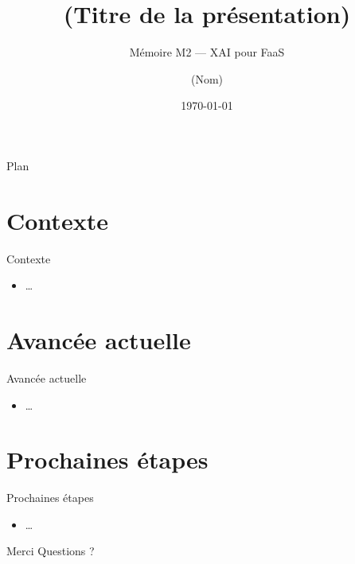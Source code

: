 \documentclass[10pt]{beamer}
\title{(Titre de la présentation)}
\subtitle{Mémoire M2 --- XAI pour FaaS}
\author{(Nom)}
\institute{Université de Dschang}
\date{\today}
\begin{document}
\frame{\titlepage}

\begin{frame}{Plan}
  \tableofcontents
\end{frame}

\section{Contexte}
\begin{frame}{Contexte}
  \begin{itemize}
    \item …
  \end{itemize}
\end{frame}

\section{Avancée actuelle}
\begin{frame}{Avancée actuelle}
  \begin{itemize}
    \item …
  \end{itemize}
\end{frame}

\section{Prochaines étapes}
\begin{frame}{Prochaines étapes}
  \begin{itemize}
    \item …
  \end{itemize}
\end{frame}

\begin{frame}{Merci}
  \centering
  \Large Questions ?
\end{frame}
\end{document}
